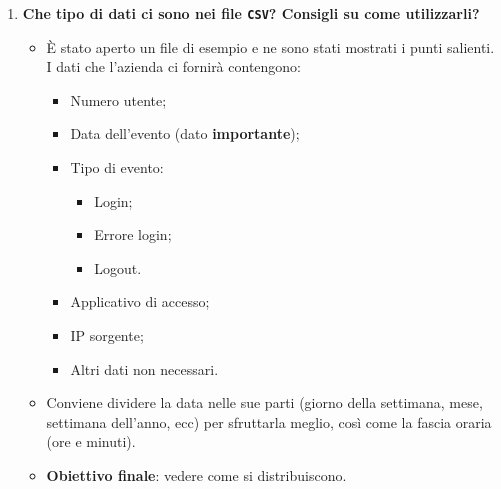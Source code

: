 \documentclass[11pt]{article}
\begin{document}
\begin{enumerate}
			\bigskip
			
			\item \textbf{Che tipo di dati ci sono nei file \texttt{CSV}?
			Consigli su come utilizzarli?}
			\medskip
			\begin{itemize}
				\item È stato aperto un file di esempio e ne sono stati mostrati i punti salienti.\\
				I dati che l'azienda ci fornirà contengono:
				\begin{itemize}
					\item Numero utente;
					\item Data dell'evento (dato \textbf{importante});
					\item Tipo di evento:
					\begin{itemize}
						\item Login;
						\item Errore login;
						\item Logout.
					\end{itemize}
					\item Applicativo di accesso;
					\item IP sorgente;
					\item Altri dati non necessari.
				\end{itemize}
				\item Conviene dividere la data nelle sue parti (giorno della settimana, mese, settimana dell'anno, ecc)
				per sfruttarla meglio, così come la fascia oraria (ore e minuti).
				\item \textbf{Obiettivo finale}: vedere come si distribuiscono.
			\end{itemize}
			
			\bigskip
			

\end{enumerate}
\end{document}
